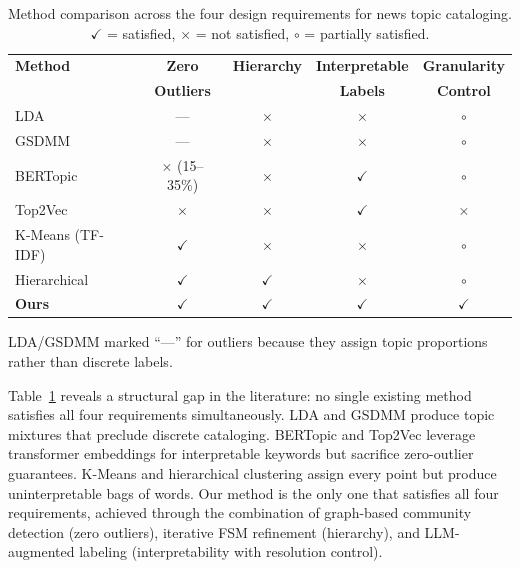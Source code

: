 \documentclass[10pt,twocolumn,twoside]{article}
\begin{document}
\begin{table}[h]
\centering
\caption{Method comparison across the four design requirements for news topic cataloging. 
$\checkmark$ = satisfied, $\times$ = not satisfied, $\circ$ = partially satisfied.}
\label{tab:method_requirement}
\small
\renewcommand{\arraystretch}{1.2}
\begin{tabular}{p{2.3cm}cccc}
\toprule
\textbf{Method} & \textbf{Zero} & \textbf{Hierarchy} & \textbf{Interpretable} & \textbf{Granularity} \\
                & \textbf{Outliers} & & \textbf{Labels} & \textbf{Control} \\
\midrule
LDA~\cite{blei2003latent} 
    & --- & $\times$ & $\times$ & $\circ$ \\
GSDMM~\cite{yin2014gsdmm} 
    & --- & $\times$ & $\times$ & $\circ$ \\
BERTopic~\cite{grootendorst2022bertopic} 
    & $\times$ (15--35\%) & $\times$ & $\checkmark$ & $\circ$ \\
Top2Vec~\cite{angelov2020} 
    & $\times$ & $\times$ & $\checkmark$ & $\times$ \\
K-Means (TF-IDF) 
    & $\checkmark$ & $\times$ & $\times$ & $\circ$ \\
Hierarchical
    & $\checkmark$ & $\checkmark$ & $\times$ & $\circ$ \\
\midrule
\textbf{Ours} 
    & \textbf{$\checkmark$} & \textbf{$\checkmark$} & \textbf{$\checkmark$} & \textbf{$\checkmark$} \\
\bottomrule
\end{tabular}
\vspace{4pt}
\par\small
{\footnotesize LDA/GSDMM marked ``---'' for outliers because they assign topic proportions rather than discrete labels.}
\end{table}

Table~\ref{tab:method_requirement} reveals a structural gap in the literature: no single existing 
method satisfies all four requirements simultaneously. LDA and GSDMM produce topic mixtures that 
preclude discrete cataloging. BERTopic and Top2Vec leverage transformer embeddings for 
interpretable keywords but sacrifice zero-outlier guarantees. K-Means and hierarchical clustering 
assign every point but produce uninterpretable bags of words. Our method is the only one that 
satisfies all four requirements, achieved through the combination of graph-based community 
detection (zero outliers), iterative FSM refinement (hierarchy), and LLM-augmented labeling 
(interpretability with resolution control).
\end{document}
